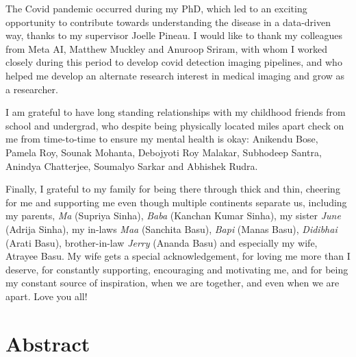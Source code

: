 \documentclass[letterpaper, 12pt]{report}
\begin{document}
The Covid pandemic occurred during my PhD, which led to an exciting opportunity to contribute towards understanding the disease in a data-driven way, thanks to my supervisor Joelle Pineau. I would like to thank my colleagues from Meta AI, Matthew Muckley and Anuroop Sriram, with whom I worked closely during this period to develop covid detection imaging pipelines, and who helped me develop an alternate research interest in medical imaging and grow as a researcher.

I am grateful to have long standing relationships with my childhood friends from school and undergrad, who despite being physically located miles apart check on me from time-to-time to ensure my mental health is okay: Anikendu Bose, Pamela Roy, Sounak Mohanta, Debojyoti Roy Malakar, Subhodeep Santra, Anindya Chatterjee, Soumalyo Sarkar and Abhishek Rudra.

Finally, I grateful to my family for being there through thick and thin, cheering for me and supporting me even though multiple continents separate us, including my parents, \textit{Ma} (Supriya Sinha), \textit{Baba} (Kanchan Kumar Sinha), my sister \textit{June} (Adrija Sinha), my in-laws \textit{Maa} (Sanchita Basu), \textit{Bapi} (Manas Basu), \textit{Didibhai} (Arati Basu), brother-in-law \textit{Jerry} (Ananda Basu) and especially my wife, Atrayee Basu. My wife gets a special acknowledgement, for loving me more than I deserve, for constantly supporting, encouraging and motivating me, and for being my constant source of inspiration, when we are together, and even when we are apart. Love you all!


\chapter*{Abstract}
\label{sec:abstract_en}
\end{document}
